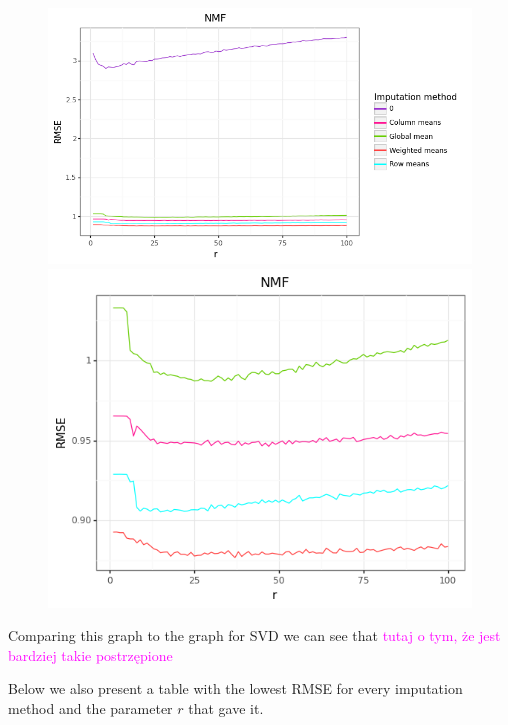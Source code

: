 \documentclass[11pt]{amsart}
\newcommand{\tami}[1]{{\textcolor{magenta}{#1}}}
\begin{document}
\begin{figure}[H]
\centering
\begin{minipage}{.5\textwidth}
  \centering
  \includegraphics[scale=0.43]{nmf_1}
\end{minipage}%
\begin{minipage}{.5\textwidth}
  \centering
  \includegraphics[scale=0.43]{nmf_2}
\end{minipage}
\end{figure}

Comparing this graph to the graph for SVD we can see that \tami{tutaj o tym, że jest bardziej takie postrzępione}

Below we also present a table with the lowest RMSE for every imputation method and the parameter $r$ that gave it.
\end{document}
